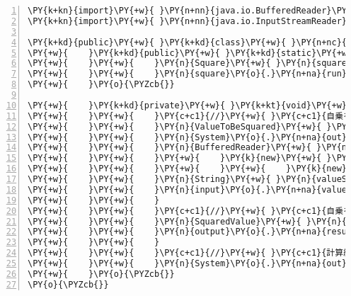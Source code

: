 \begin{Verbatim}[commandchars=\\\{\},numbers=left,firstnumber=1,stepnumber=1,frame=single,fontsize=\small]
\PY{k+kn}{import}\PY{+w}{ }\PY{n+nn}{java.io.BufferedReader}\PY{o}{;}
\PY{k+kn}{import}\PY{+w}{ }\PY{n+nn}{java.io.InputStreamReader}\PY{o}{;}

\PY{k+kd}{public}\PY{+w}{ }\PY{k+kd}{class}\PY{+w}{ }\PY{n+nc}{Square}\PY{+w}{ }\PY{o}{\PYZob{}}
\PY{+w}{    }\PY{k+kd}{public}\PY{+w}{ }\PY{k+kd}{static}\PY{+w}{ }\PY{k+kt}{void}\PY{+w}{ }\PY{n+nf}{main}\PY{o}{(}\PY{n}{String}\PY{o}{[}\PY{o}{]}\PY{+w}{ }\PY{n}{args}\PY{o}{)}\PY{+w}{ }\PY{k+kd}{throws}\PY{+w}{ }\PY{n}{Exception}\PY{+w}{ }\PY{o}{\PYZob{}}
\PY{+w}{    }\PY{+w}{    }\PY{n}{Square}\PY{+w}{ }\PY{n}{square}\PY{+w}{ }\PY{o}{=}\PY{+w}{ }\PY{k}{new}\PY{+w}{ }\PY{n}{Square}\PY{o}{(}\PY{o}{)}\PY{o}{;}
\PY{+w}{    }\PY{+w}{    }\PY{n}{square}\PY{o}{.}\PY{n+na}{run}\PY{o}{(}\PY{o}{)}\PY{o}{;}
\PY{+w}{    }\PY{o}{\PYZcb{}}

\PY{+w}{    }\PY{k+kd}{private}\PY{+w}{ }\PY{k+kt}{void}\PY{+w}{ }\PY{n+nf}{run}\PY{o}{(}\PY{o}{)}\PY{+w}{ }\PY{k+kd}{throws}\PY{+w}{ }\PY{n}{Exception}\PY{+w}{ }\PY{o}{\PYZob{}}
\PY{+w}{    }\PY{+w}{    }\PY{c+c1}{//}\PY{+w}{ }\PY{c+c1}{自乗を計算する値を入力する}
\PY{+w}{    }\PY{+w}{    }\PY{n}{ValueToBeSquared}\PY{+w}{ }\PY{n}{input}\PY{+w}{ }\PY{o}{=}\PY{+w}{ }\PY{k}{new}\PY{+w}{ }\PY{n}{ValueToBeSquared}\PY{o}{(}\PY{o}{)}\PY{o}{;}
\PY{+w}{    }\PY{+w}{    }\PY{n}{System}\PY{o}{.}\PY{n+na}{out}\PY{o}{.}\PY{n+na}{print}\PY{o}{(}\PY{l+s}{"自乗を計算する値を入力してください："}\PY{o}{)}\PY{o}{;}
\PY{+w}{    }\PY{+w}{    }\PY{n}{BufferedReader}\PY{+w}{ }\PY{n}{reader}\PY{+w}{ }\PY{o}{=}
\PY{+w}{    }\PY{+w}{    }\PY{+w}{    }\PY{k}{new}\PY{+w}{ }\PY{n+nf}{BufferedReader}\PY{o}{(}
\PY{+w}{    }\PY{+w}{    }\PY{+w}{    }\PY{+w}{    }\PY{k}{new}\PY{+w}{ }\PY{n+nf}{InputStreamReader}\PY{o}{(}\PY{n}{System}\PY{o}{.}\PY{n+na}{in}\PY{o}{)}\PY{o}{)}\PY{o}{;}
\PY{+w}{    }\PY{+w}{    }\PY{n}{String}\PY{+w}{ }\PY{n}{valueString}\PY{+w}{ }\PY{o}{=}\PY{+w}{ }\PY{n}{reader}\PY{o}{.}\PY{n+na}{readLine}\PY{o}{(}\PY{o}{)}\PY{o}{;}
\PY{+w}{    }\PY{+w}{    }\PY{n}{input}\PY{o}{.}\PY{n+na}{value}\PY{+w}{ }\PY{o}{=}\PY{+w}{ }\PY{n}{Double}\PY{o}{.}\PY{n+na}{parseDouble}\PY{o}{(}\PY{n}{valueString}\PY{o}{)}\PY{o}{;}
\PY{+w}{    }\PY{+w}{    }
\PY{+w}{    }\PY{+w}{    }\PY{c+c1}{//}\PY{+w}{ }\PY{c+c1}{自乗を計算する}
\PY{+w}{    }\PY{+w}{    }\PY{n}{SquaredValue}\PY{+w}{ }\PY{n}{output}\PY{+w}{ }\PY{o}{=}\PY{+w}{ }\PY{k}{new}\PY{+w}{ }\PY{n}{SquaredValue}\PY{o}{(}\PY{o}{)}\PY{o}{;}
\PY{+w}{    }\PY{+w}{    }\PY{n}{output}\PY{o}{.}\PY{n+na}{result}\PY{+w}{ }\PY{o}{=}\PY{+w}{ }\PY{n}{input}\PY{o}{.}\PY{n+na}{value}\PY{+w}{ }\PY{o}{*}\PY{+w}{ }\PY{n}{input}\PY{o}{.}\PY{n+na}{value}\PY{o}{;}
\PY{+w}{    }\PY{+w}{    }
\PY{+w}{    }\PY{+w}{    }\PY{c+c1}{//}\PY{+w}{ }\PY{c+c1}{計算結果を出力する}
\PY{+w}{    }\PY{+w}{    }\PY{n}{System}\PY{o}{.}\PY{n+na}{out}\PY{o}{.}\PY{n+na}{println}\PY{o}{(}\PY{l+s}{"計算結果："}\PY{+w}{ }\PY{o}{+}\PY{+w}{ }\PY{n}{output}\PY{o}{.}\PY{n+na}{result}\PY{o}{)}\PY{o}{;}
\PY{+w}{    }\PY{o}{\PYZcb{}}
\PY{o}{\PYZcb{}}
\end{Verbatim}

